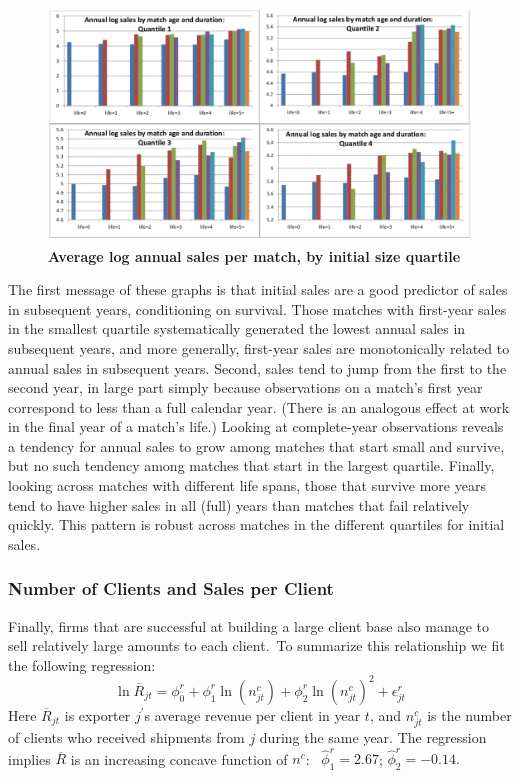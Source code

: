 \begin{center}
\begin{figure}
    \includegraphics[width=\textwidth]{figures/figure1.pdf}
    \caption{\textbf{Average log annual sales per match, by initial size quartile}}
    \label{fig:match_maturation}
\end{figure}
\end{center}

The first message of these graphs is that initial sales are a good predictor
of sales in subsequent years, conditioning on survival. Those matches with
first-year sales in the smallest quartile systematically generated the
lowest annual sales in subsequent years, and more generally, first-year
sales are monotonically related to annual sales in subsequent years. Second,
sales tend to jump from the first to the second year, in large part simply
because observations on a match's first year correspond to less than a full
calendar year. (There is an analogous effect at work in the final year of a
match's life.) Looking at complete-year observations reveals a tendency for
annual sales to grow among matches that start small and survive, but no such
tendency among matches that start in the largest quartile. Finally, looking
across matches with different life spans, those that survive more years tend
to have higher sales in all (full) years than matches that fail relatively
quickly. This pattern is robust across matches in the different quartiles
for initial sales.

\subsubsection{Number of Clients and Sales per Client}

Finally, firms that are successful at building a large client base also
manage to sell relatively large amounts to each client.\ To summarize this
relationship we fit the following regression:%
\begin{equation*}
\ln \overline{R}_{jt}=\phi _{0}^{r}+\phi _{1}^{r}\ln (n_{jt}^{c})+\phi
_{2}^{r}\ln (n_{jt}^{c})^{2}+\epsilon _{jt}^{r}
\end{equation*}%
Here $\overline{R}_{jt}$ is exporter $j^{\prime }$s average revenue per
client in year $t$, and $n_{jt}^{c}$ is the number of clients who received
shipments from $j$ during the same year. The regression implies $\overline{R}
$ is an increasing concave function of $n^{c}$: \ $\widehat{\phi }%
_{1}^{r}=2.67$; $\widehat{\phi }_{2}^{r}=-0.14.$

